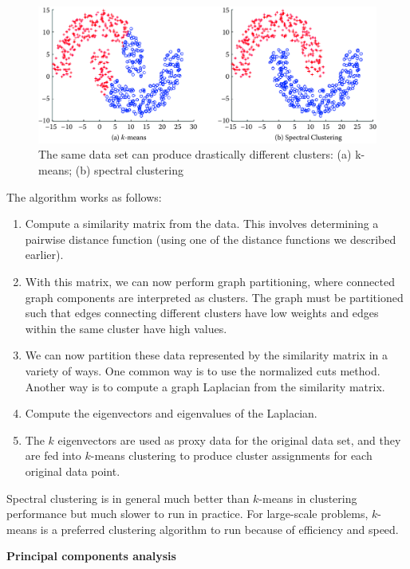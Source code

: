\documentclass[]{krantz}
\begin{document}
\begin{figure}

{\centering \includegraphics[width=0.7\linewidth]{ChapterML/figures/spectral} 

}

\caption{The same data set can produce drastically different clusters: (a) k-means; (b) spectral clustering}\label{fig:spectral}
\end{figure}

The algorithm works as follows:

\begin{enumerate}
\def\labelenumi{\arabic{enumi}.}
\item
  Compute a similarity matrix from the data. This involves determining a
  pairwise distance function (using one of the distance functions we
  described earlier).
\item
  With this matrix, we can now perform graph partitioning, where
  connected graph components are interpreted as clusters. The graph must
  be partitioned such that edges connecting different clusters have low
  weights and edges within the same cluster have high values.
\item
  We can now partition these data represented by the similarity matrix
  in a variety of ways. One common way is to use the normalized cuts
  method. Another way is to compute a graph Laplacian from the
  similarity matrix.
\item
  Compute the eigenvectors and eigenvalues of the Laplacian.
\item
  The \(k\) eigenvectors are used as proxy data for the original data
  set, and they are fed into \(k\)-means clustering to produce cluster
  assignments for each original data point.
\end{enumerate}

Spectral clustering is in general much better than \(k\)-means in
clustering performance but much slower to run in practice. For
large-scale problems, \(k\)-means is a preferred clustering algorithm to
run because of efficiency and speed.

\textbf{Principal components analysis}
\end{document}
